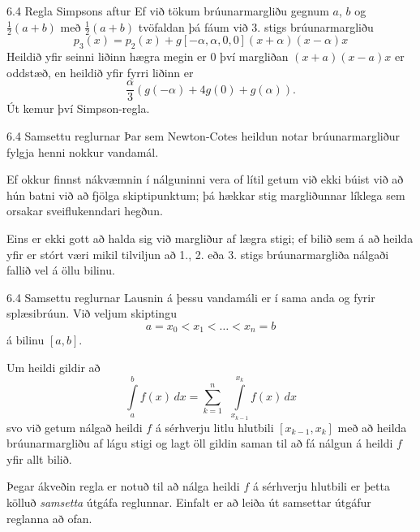 \begin{frame}{6.4 Regla Simpsons aftur}
Ef við tökum brúunarmargliðu gegnum $a$, $b$ og $\frac{1}{2}(a+b)$ með
$\frac{1}{2}(a+b)$ tvöfaldan þá fáum við 3. stigs brúunarmargliðu 
\begin{equation*}
  p_3(x) = p_2(x) + g[-\alpha, \alpha, 0, 0](x+\alpha)(x-\alpha)x
\end{equation*} \pause
Heildið yfir seinni liðinn hægra megin er 0 því 
margliðan $(x+a)(x-a)x$ er oddstæð, \pause
en heildið yfir 
fyrri liðinn er 
$$
  \frac \alpha3(g(-\alpha) + 4g(0) + g(\alpha)).
$$
\pause
Út kemur því Simpson-regla.  
\end{frame}


\begin{frame}{6.4 Samsettu reglurnar} 
Þar sem Newton-Cotes heildun notar brúunarmargliður fylgja henni
nokkur vandamál. 

\pause
\smallskip
Ef okkur finnst nákvæmnin í nálguninni vera of lítil
getum við ekki búist við að hún batni við að fjölga skiptipunktum; þá
hækkar stig margliðunnar líklega sem orsakar sveiflukenndari
hegðun. 

\pause
\smallskip
Eins er ekki gott að halda sig við margliður af lægra stigi;
ef bilið sem á að heilda yfir er stórt væri mikil tilviljun að 1.,
2. eða 3. stigs brúunarmargliða nálgaði fallið vel á öllu bilinu. 
\end{frame}


\begin{frame}{6.4 Samsettu reglurnar} 
Lausnin á þessu vandamáli er í sama anda og fyrir splæsibrúun. \pause
Við veljum skiptingu 
\begin{equation*}
  a  =x_0 < x_1 < \ldots < x_n = b
\end{equation*}
á bilinu $[a,b]$. 

\pause
\smallskip
Um heildi gildir að
\begin{equation*}
  \int\limits_a^bf(x)\, dx = \sum\limits_{k=1}^n \ \ \int\limits_{x_{k-1}}^{x_k} f(x) \, dx
\end{equation*}
svo við getum nálgað heildi $f$ á sérhverju litlu hlutbili
$[x_{k-1},x_k]$ með að heilda brúunarmargliðu af lágu stigi og lagt
öll gildin saman til að fá nálgun á heildi $f$ yfir allt bilið. 

\pause
\smallskip
Þegar ákveðin regla er notuð til að nálga heildi $f$ á sérhverju
hlutbili er þetta kölluð {\it samsetta} útgáfa reglunnar. Einfalt er að leiða
út samsettar útgáfur reglanna að ofan. 
\end{frame}


